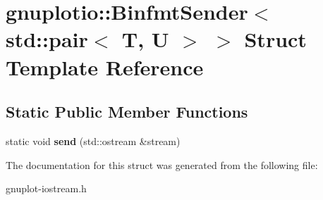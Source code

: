 \hypertarget{structgnuplotio_1_1BinfmtSender_3_01std_1_1pair_3_01T_00_01U_01_4_01_4}{}\section{gnuplotio\+:\+:Binfmt\+Sender$<$ std\+:\+:pair$<$ T, U $>$ $>$ Struct Template Reference}
\label{structgnuplotio_1_1BinfmtSender_3_01std_1_1pair_3_01T_00_01U_01_4_01_4}
\subsection*{Static Public Member Functions}
\begin{DoxyCompactItemize}
\item 
\mbox{\label{structgnuplotio_1_1BinfmtSender_3_01std_1_1pair_3_01T_00_01U_01_4_01_4_a08b2bedbc54824cd202c664116e37243}} 
static void {\bfseries send} (std\+::ostream \&stream)
\end{DoxyCompactItemize}


The documentation for this struct was generated from the following file\+:\begin{DoxyCompactItemize}
\item 
gnuplot-\/iostream.\+h\end{DoxyCompactItemize}
